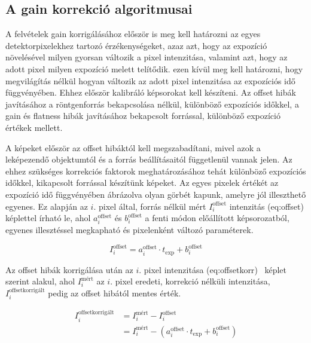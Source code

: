\documentclass[a4paper,12pt]{article}
\begin{document}
\subsection{A gain korrekció algoritmusai}

A felvételek gain korrigálásához először is meg kell határozni az egyes detektorpixelekhez tartozó érzékenységeket, azaz azt, hogy az expozíció növelésével milyen gyorsan változik a pixel intenzitása, valamint azt, hogy az adott pixel milyen expozíció melett telítődik. ezen kívül meg kell határozni, hogy megvilágítás nélkül hogyan változik az adott pixel intenzitása az expozíciós idő függvényében. Ehhez először kalibráló képsorokat kell készíteni. Az offset hibák javításához a röntgenforrás bekapcsolása nélkül, különböző expozíciós időkkel, a gain és flatness hibák javításához bekapcsolt forrással, különböző expozíció értékek mellett. 

A képeket először az offset hibáktól kell megszabadítani, mivel azok a leképezendő objektumtól és a forrás beállításaitól függetlenül vannak jelen. Az ehhez szükséges korrekciós faktorok meghatározásához tehát különböző expozíciós időkkel, kikapcsolt forrással készítünk képeket. Az egyes pixelek értékét az expozíció idő függvényében ábrázolva olyan görbét kapunk, amelyre jól illeszthető egyenes. Ez alapján az $i$. pixel által, forrás nélkül mért $ I_i^{\text{offset}}$ intenzitás \aref({eq:offset}) képlettel írható le, ahol $a_i^{\text{offset}} $ és $b_i^{\text{offset}}$ a fenti módon előállított képsorozatból, egyenes illesztéssel megkapható és pixelenként változó paraméterek.

\begin{equation}
\label{eq:offset}
I_i^{\text{offset}} =  a_i^{\text{offset}} \cdot t_{\text{exp}} + b_i^{\text{offset}}
\end{equation}

Az offset hibák korrigálása után  az $i$. pixel intenzitása \aref({eq:offsetkorr})~ képlet szerint alakul, ahol $I_i^{\text{mért}}$ az $i.$ pixel eredeti, korrekció nélküli intenzitása, $I_i^{\text{offsetkorrigált}}$ pedig az offset hibától mentes érték.

\begin{equation}
\label{eq:offsetkorr}
\begin{split}
I_i^{\text{offsetkorrigált}}  &=  I_i^{\text{mért}} - I_i^{\text{offset}} \\&=  I_i^{\text{mért}} - \left( a_i^{\text{offset}} \cdot t_{\text{exp}} + b_i^{\text{offset}} \right)
\end{split}
\end{equation}
\end{document}
